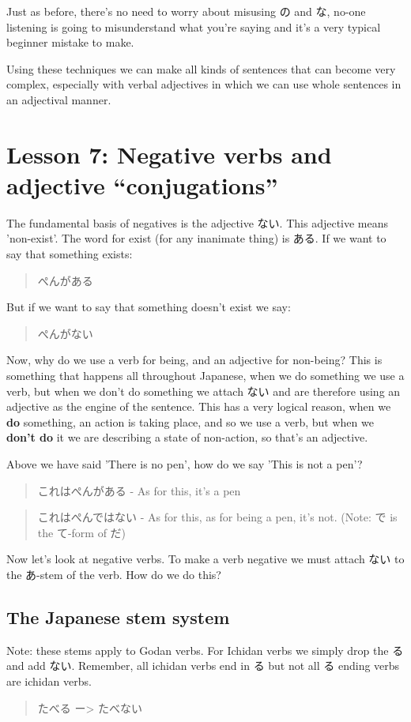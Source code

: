 \documentclass[11pt]{article}
\begin{document}
Just as before, there's no need to worry about misusing の and な, no-one listening is going to misunderstand what you're saying and it's a very typical beginner mistake to make.

Using these techniques we can make all kinds of sentences that can become very complex, especially with verbal adjectives in which we can use whole sentences in an adjectival manner.
\section{Lesson 7: Negative verbs and adjective ``conjugations''}
\label{sec:orgf0f8f89}
The fundamental basis of negatives is the adjective ない. This adjective means 'non-exist'. The word for exist (for any inanimate thing) is ある. If we want to say that something exists:
\begin{quote}
ぺんがある
\end{quote}
But if we want to say that something doesn't exist we say:
\begin{quote}
ぺんがない
\end{quote}
Now, why do we use a verb for being, and an adjective for non-being? This is something that happens all throughout Japanese, when we do something we use a verb, but when we don't do something we attach ない and are therefore using an adjective as the engine of the sentence. This has a very logical reason, when we \textbf{do} something, an action is taking place, and so we use a verb, but when we \textbf{don't do} it we are describing a state of non-action, so that's an adjective.

Above we have said 'There is no pen', how do we say 'This is not a pen'?
\begin{quote}
これはぺんがある - As for this, it's a pen
\end{quote}
\begin{quote}
これはぺんではない - As for this, as for being a pen, it's not. (Note: で is the て-form of だ)
\end{quote}

Now let's look at negative verbs. To make a verb negative we must attach ない to the あ-stem of the verb. How do we do this?

\subsection{The Japanese stem system}
\label{sec:orge974128}
Note: these stems apply to Godan verbs. For Ichidan verbs we simply drop the る and add ない. Remember, all ichidan verbs end in る but not all る ending verbs are ichidan verbs.
\begin{quote}
たべる ー> たべない
\end{quote}
\end{document}
